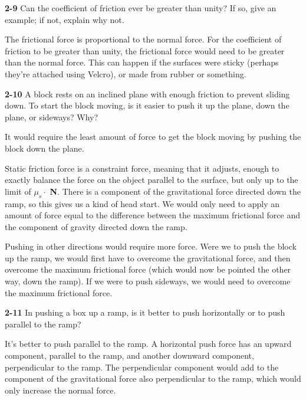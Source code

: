 \documentclass{amsart}
\begin{document}
\vspace{\baselineskip}

\noindent
\textbf{2-9} Can the coefficient of friction ever be greater than unity?
If so, give an example; if not, explain why not.

The frictional force is proportional to the normal force.
For the coefficient of friction to be greater than unity, the frictional force would need to be greater than the normal force.
This can happen if the surfaces were sticky (perhaps they're attached using Velcro), or made from rubber or something.

\vspace{\baselineskip}

\noindent
\textbf{2-10} A block rests on an inclined plane with enough friction to prevent sliding down.
To start the block moving, is it easier to push it up the plane, down the plane, or sideways?  Why?

It would require the least amount of force to get the block moving by pushing the block down the plane.

Static friction force is a constraint force, meaning that it adjusts, enough to exactly balance the force
on the object parallel to the surface, but only up to the limit of $\mu_s \cdot$ \textbf{N}.
There is a component of the gravitational force directed down the ramp, so this gives us a kind of head start.
We would only need to apply an amount of force equal to the difference between the maximum frictional force
and the component of gravity directed down the ramp.

Pushing in other directions would require more force.
Were we to push the block up the ramp, we would first have to overcome the gravitational force,
and then overcome the maximum frictional force (which would now be pointed the other way, down the ramp).
If we were to push sideways, we would need to overcome the maximum frictional force.

\vspace{\baselineskip}

\noindent
\textbf{2-11} In pushing a box up a ramp, is it better to push horizontally or to push parallel to the ramp?

It's better to push parallel to the ramp.  A horizontal push force has an upward component, parallel to the ramp,
and another downward component, perpendicular to the ramp.  The perpendicular component would add to the component
of the gravitational force also perpendicular to the ramp, which would only increase the normal force.
\end{document}
